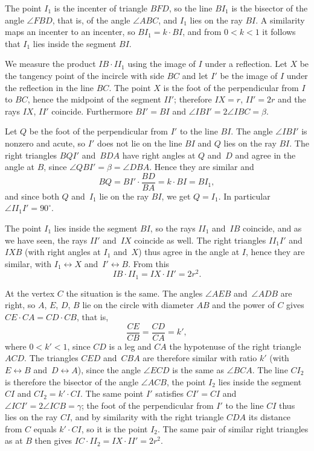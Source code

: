 {    The point $I_1$ is the incenter of triangle $BFD$, so the line $BI_1$ is the bisector of the angle $\angle FBD$, that is, of the angle $\angle ABC$, and $I_1$ lies on the ray $BI$. A similarity maps an incenter to an incenter, so $BI_1 = k \cdot BI$, and from $0 < k < 1$ it follows that $I_1$ lies inside the segment $BI$.

    We measure the product $IB \cdot II_1$ using the image of $I$ under a reflection. Let $X$ be the tangency point of the incircle with side $BC$ and let $I'$ be the image of $I$ under the reflection in the line $BC$. The point $X$ is the foot of the perpendicular from $I$ to $BC$, hence the midpoint of the segment $II'$; therefore $IX = r$, $II' = 2r$ and the rays $IX$, $II'$ coincide. Furthermore $BI' = BI$ and $\angle IBI' = 2\angle IBC = \beta$.

    Let $Q$ be the foot of the perpendicular from $I'$ to the line $BI$. The angle $\angle IBI'$ is nonzero and acute, so $I'$ does not lie on the line $BI$ and $Q$ lies on the ray $BI$. The right triangles $BQI'$ and~$BDA$ have right angles at $Q$ and~$D$ and agree in the angle at $B$, since $\angle QBI' = \beta = \angle DBA$. Hence they are similar and
    $$
    BQ = BI' \cdot \frac{BD}{BA} = k \cdot BI = BI_1,
    $$
    and since both $Q$ and~$I_1$ lie on the ray $BI$, we get $Q = I_1$. In particular $\angle II_1I' = 90^\circ$.

    The point $I_1$ lies inside the segment $BI$, so the rays $II_1$ and~$IB$ coincide, and as we have seen, the rays $II'$ and~$IX$ coincide as well. The right triangles $II_1I'$ and~$IXB$ (with right angles at $I_1$ and~$X$) thus agree in the angle at $I$, hence they are similar, with $I_1 \leftrightarrow X$ and~$I' \leftrightarrow B$. From this
    $$
    IB \cdot II_1 = IX \cdot II' = 2r^2.
    $$

    At the vertex $C$ the situation is the same. The angles $\angle AEB$ and~$\angle ADB$ are right, so $A$, $E$, $D$, $B$ lie on the circle with diameter $AB$ and the power of $C$ gives $CE \cdot CA = CD \cdot CB$, that is,
    $$
    \frac{CE}{CB} = \frac{CD}{CA} = k',
    $$
    where $0 < k' < 1$, since $CD$ is a leg and $CA$ the hypotenuse of the right triangle $ACD$. The triangles $CED$ and~$CBA$ are therefore similar with ratio $k'$ (with $E \leftrightarrow B$ and~$D \leftrightarrow A$), since the angle $\angle ECD$ is the same as $\angle BCA$. The line $CI_2$ is therefore the bisector of the angle $\angle ACB$, the point $I_2$ lies inside the segment $CI$ and $CI_2 = k' \cdot CI$. The same point $I'$ satisfies $CI' = CI$ and $\angle ICI' = 2\angle ICB = \gamma$; the foot of the perpendicular from $I'$ to the line $CI$ thus lies on the ray $CI$, and by similarity with the right triangle $CDA$ its distance from $C$ equals $k' \cdot CI$, so it is the point $I_2$. The same pair of similar right triangles as at $B$ then gives $IC \cdot II_2 = IX \cdot II' = 2r^2$.

}
